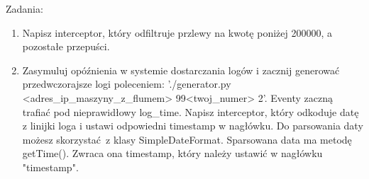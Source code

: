 \documentclass{article}
\begin{document}
\pagebreak

Zadania:
\begin{enumerate}
\item Napisz interceptor, który odfiltruje przlewy na kwotę poniżej 200000, a pozostałe przepuści.
\item Zasymuluj opóźnienia w systemie dostarczania logów i zacznij generować przedwczorajsze logi poleceniem: './generator.py <adres\_ip\_maszyny\_z\_flumem> 99<twoj\_numer> 2'. Eventy zaczną trafiać pod nieprawidłowy log\_time. Napisz interceptor, który odkoduje datę z linijki loga i ustawi odpowiedni timestamp w nagłówku. Do parsowania daty możesz skorzystać z klasy SimpleDateFormat. Sparsowana data ma metodę getTime(). Zwraca ona timestamp, który należy ustawić w nagłówku "timestamp".
\end{enumerate}
\end{document}
